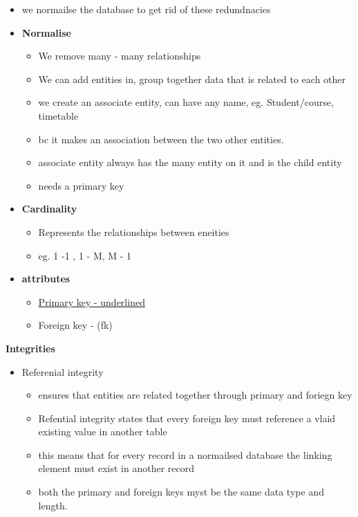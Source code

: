 \documentclass[12pt, a4, twoside]{article}
\begin{document}
\begin{center}
\begin{itemize}
\begin{itemize}
\begin{itemize}
      \end{itemize}
      \item we normailse the database to get rid of these redundnacies 
      \item \textbf{Normalise}
      \begin{itemize}
        \item We remove many - many relationships
        \item We can add entities in, group together data that is related to each other 
        \item we create an associate entity, can have any name, eg. Student/course, timetable
        \item bc it makes an association between the two other entities.
        \item associate entity always has the many entity on it and is the child entity
        \item needs a primary key
      \end{itemize}
      \item \textbf{Cardinality}
      \begin{itemize}
        \item Represents the relationships between eneities 
        \item eg. 1 -1 , 1 - M, M - 1
      \end{itemize}
      \item \textbf{attributes}
      \begin{itemize}
        \item \underline{Primary key - underlined }
        \item Foreign key - (fk)
      \end{itemize}
    \end{itemize}
    \textbf{Integrities}
    \begin{itemize}
      \item Referenial integrity
      \begin{itemize}
        \item ensures that entities are related together through primary and foriegn key 
        \item Refential integrity states that every foreign key must reference a vlaid existing value in another table
        \item this means that for every record in a normailsed database the linking element must exist in another record 
        \item both the primary and foreign keys myst be the same data type and length.

\end{itemize}
\end{itemize}
\end{itemize}
\end{center}
\end{document}
